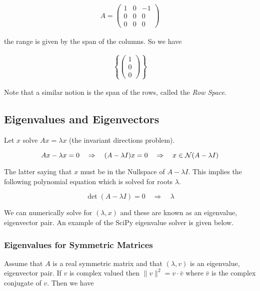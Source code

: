 \[\begin{aligned}
A = \begin{pmatrix} 1 & 0 & -1\\ 0 & 0 & 0 \\ 0 & 0 & 0\end{pmatrix}
\end{aligned}\]

the range is given by the span of the columns. So we have

\[\begin{aligned}
\left\{\begin{pmatrix} 1 \\ 0\\ 0\end{pmatrix}\right\}
\end{aligned}\]

Note that a similar notion is the span of the rows, called the \emph{Row
Space}.

\hypertarget{eigenvalues-and-eigenvectors}{%
\subsection{Eigenvalues and
Eigenvectors}\label{eigenvalues-and-eigenvectors}}

Let \(x\) solve \(Ax=\lambda x\) (the invariant directions problem).

\[Ax-\lambda x=0 \quad\Rightarrow\quad (A-\lambda I)x=0\quad \Rightarrow \quad x\in {\cal N}(A-\lambda I)\]

The latter saying that \(x\) must be in the Nullspace of
\(A-\lambda I\). This implies the following polynomial equation which is
solved for roots \(\lambda\).

\[\det (A-\lambda I)=0 \quad \Rightarrow \quad \lambda\]

We can numerically solve for \((\lambda , x)\) and these are known as an
eigenvalue, eigenvector pair. An example of the SciPy eigenvalue solver
is given below.

\hypertarget{eigenvalues-for-symmetric-matrices}{%
\subsubsection{Eigenvalues for Symmetric
Matrices}\label{eigenvalues-for-symmetric-matrices}}

Assume that \(A\) is a real symmetric matrix and that \((\lambda, v)\)
is an eigenvalue, eigenvector pair. If \(v\) is complex valued then
\(\| v \|^2 = v \cdot \bar{v}\) where \(\bar{v}\) is the complex
conjugate of \(v\). Then we have

